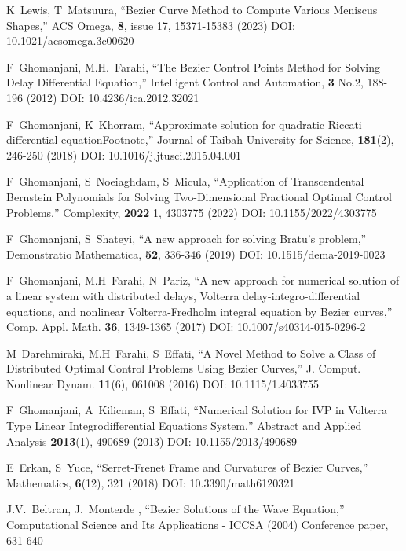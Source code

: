 \documentclass[12pt]{article}
\begin{document}
\begin{thebibliography}{0}
	
	K~Lewis, T~Matsuura,
	``Bezier Curve Method to Compute Various Meniscus Shapes,''
	ACS Omega, \textbf{8}, issue 17, 15371-15383 (2023)
	DOI: 10.1021/acsomega.3c00620

	F~Ghomanjani, M.H.~Farahi,
	``The Bezier Control Points Method for Solving Delay Differential Equation,''
	Intelligent Control and Automation, \textbf{3} No.2, 188-196 (2012)
	DOI: 10.4236/ica.2012.32021 

	F~Ghomanjani, K~Khorram,
	``Approximate solution for quadratic Riccati differential equationFootnote,''
	Journal of Taibah University for Science, \textbf{181}(2), 246-250 (2018)
	DOI: 10.1016/j.jtusci.2015.04.001

	F~Ghomanjani, S~Noeiaghdam, S~Micula,
	``Application of Transcendental Bernstein Polynomials for Solving Two-Dimensional Fractional Optimal Control Problems,''
	Complexity, \textbf{2022} 1, 4303775 (2022)
	DOI: 10.1155/2022/4303775

	F~Ghomanjani, S~Shateyi,
	``A new approach for solving Bratu's problem,''
	Demonstratio Mathematica, \textbf{52}, 336-346 (2019)
	DOI: 10.1515/dema-2019-0023

	F~Ghomanjani, M.H~Farahi, N~Pariz,
	``A new approach for numerical solution of a linear system with distributed delays, Volterra delay-integro-differential equations, and nonlinear Volterra-Fredholm integral equation by Bezier curves,''
	Comp. Appl. Math. \textbf{36}, 1349-1365 (2017)
	DOI: 10.1007/s40314-015-0296-2

	M~Darehmiraki, M.H~Farahi, S~Effati,
	``A Novel Method to Solve a Class of Distributed Optimal Control Problems Using Bezier Curves,''
	J. Comput. Nonlinear Dynam. \textbf{11}(6), 061008 (2016)
	DOI: 10.1115/1.4033755

	F~Ghomanjani, A~Kilicman, S~Effati,
	``Numerical Solution for IVP in Volterra Type Linear Integrodifferential Equations System,''
	Abstract and Applied Analysis \textbf{2013}(1), 490689 (2013)
	DOI: 10.1155/2013/490689

	E~Erkan, S~Yuce,
	``Serret-Frenet Frame and Curvatures of Bezier Curves,''
	Mathematics, \textbf{6}(12), 321 (2018)
	DOI: 10.3390/math6120321

	J.V.~Beltran, J.~Monterde ,
	``Bezier Solutions of the Wave Equation,''
	Computational Science and Its Applications - ICCSA (2004) Conference paper, 631-640


\end{thebibliography}
\end{document}

